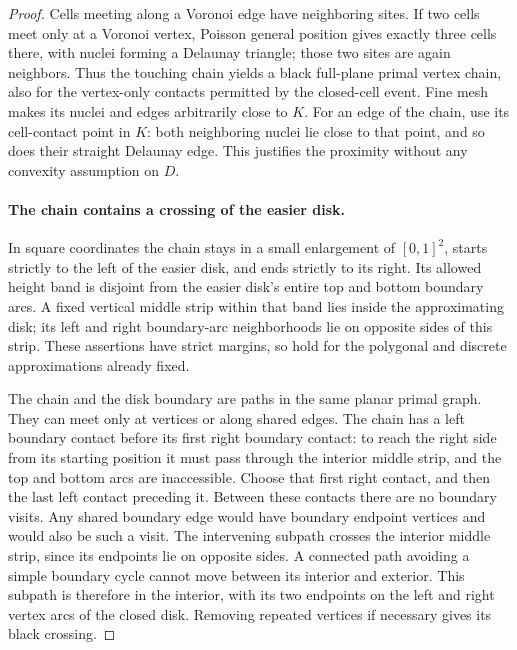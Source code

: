 \begin{proof}
Cells meeting along a Voronoi edge have neighboring sites. If two cells
meet only at a Voronoi vertex, Poisson general position gives exactly
three cells there, with nuclei forming a Delaunay triangle; those two
sites are again neighbors. Thus the touching chain yields a black
full-plane primal vertex chain, also for the vertex-only contacts
permitted by the closed-cell event. Fine mesh makes its nuclei and edges
arbitrarily close to $K$. For an edge of the chain, use its cell-contact
point in $K$: both neighboring nuclei lie close to that point, and so
does their straight Delaunay edge. This justifies the proximity without
any convexity assumption on $D$.

\paragraph{The chain contains a crossing of the easier disk.}
In square coordinates the chain stays in a small enlargement of
$[0,1]^2$, starts strictly to the left of the easier disk, and ends
strictly to its right. Its allowed height band is disjoint from the
easier disk's entire top and bottom boundary arcs. A fixed vertical
middle strip within that band lies inside the approximating disk; its
left and right boundary-arc neighborhoods lie on opposite sides of this
strip. These assertions have strict margins, so hold for the polygonal
and discrete approximations already fixed.

\begingroup{}
The chain and the disk boundary are paths in the same planar primal
graph. They can meet only at vertices or along shared edges. The chain
has a left boundary contact before its first right boundary contact:
to reach the right side from its starting position it must pass through
the interior middle strip, and the top and bottom arcs are inaccessible.
Choose that first right contact, and then the last left contact
preceding it. Between these contacts there are no boundary visits.
Any shared boundary edge would have boundary endpoint vertices and
would also be such a visit. The intervening subpath crosses the interior
middle strip, since its endpoints lie on opposite sides. A connected
path avoiding a simple boundary cycle cannot move between its interior
and exterior. This subpath is therefore in the interior, with its two
endpoints on the left and right vertex arcs of the closed disk. Removing
repeated vertices if necessary gives its black crossing.\par
\endgroup


\end{proof}
